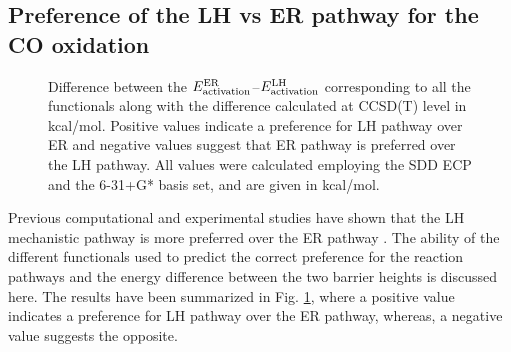 \subsection{Preference of the LH vs ER pathway for the CO oxidation}
\begin{figure}[!t]
\centering
{}
\caption{Difference between the $E_{\rm{activation}}^{\rm{ER}}$--$E_{\rm{activation}}^{\rm{LH}}$ corresponding to all the functionals along with the difference calculated at CCSD(T) level in kcal/mol. Positive values indicate a preference for LH pathway over ER and negative values suggest that ER pathway is preferred over the LH pathway. All values were calculated employing the SDD ECP and the 6-31+G* basis set, and are given in kcal/mol.} \label{ER-LH-diff}
\end{figure}
Previous computational and experimental studies have shown that the LH mechanistic pathway is more preferred over the ER pathway \cite{Jena2012,Olga2010,ping2010}. The ability of the different functionals used to predict the correct preference for the reaction pathways and the energy difference between the two barrier heights is discussed here. The results have been summarized in Fig. \ref{ER-LH-diff}, where a positive value indicates a preference for LH pathway over the ER pathway, whereas, a negative value suggests the opposite. \\
